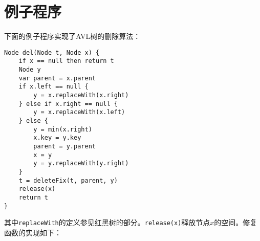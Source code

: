 \documentclass[b5paper]{ctexart}
\begin{document}
\begin{Exercise}
\end{Exercise}

\section{例子程序}

下面的例子程序实现了AVL树的删除算法：

\begin{lstlisting}[language = Bourbaki]
Node del(Node t, Node x) {
    if x == null then return t
    Node y
    var parent = x.parent
    if x.left == null {
        y = x.replaceWith(x.right)
    } else if x.right == null {
        y = x.replaceWith(x.left)
    } else {
        y = min(x.right)
        x.key = y.key
        parent = y.parent
        x = y
        y = y.replaceWith(y.right)
    }
    t = deleteFix(t, parent, y)
    release(x)
    return t
}
\end{lstlisting}

其中\texttt{replaceWith}的定义参见红黑树的部分。\texttt{release(x)}释放节点$x$的空间。修复函数的实现如下：
\end{document}
